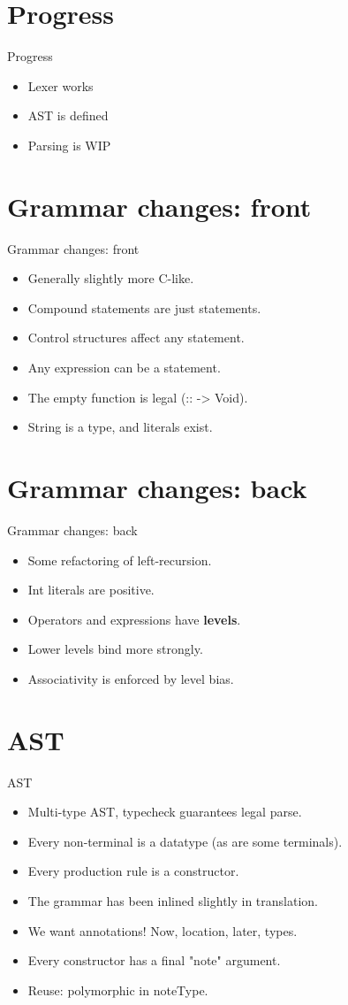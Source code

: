 \documentclass
  [ department=icis
  , notes={show notes}
  , slidesperpage=1
  , nohandout
  , official=true
  ] {beamerruhuisstijl}
\newcommand{\frameAndSection}[1]{\section{#1}\begin{frame}{#1}}
\begin{document}
\frameAndSection{Progress}
\onslide<+->
\begin{itemize}
    \onslide<+->\item Lexer works
    \onslide<+->\item AST is defined
    \onslide<+->\item Parsing is WIP
\end{itemize}
\end{frame}

\frameAndSection{Grammar changes: front}
\onslide<+->
\begin{itemize}
    \onslide<+->\item Generally slightly more C-like.
    \onslide<+->\item Compound statements are just statements.
    \onslide<+->\item Control structures affect any statement.
    \onslide<+->\item Any expression can be a statement.
    \onslide<+->\item The empty function is legal (:: -> Void).
    \onslide<+->\item String is a type, and literals exist.
\end{itemize}
\end{frame}

\frameAndSection{Grammar changes: back}
\onslide<+->
\begin{itemize}
    \onslide<+->\item Some refactoring of left-recursion.
    \onslide<+->\item Int literals are positive.
    \onslide<+->\item Operators and expressions have \textbf{levels}.
    \onslide<+->\item Lower levels bind more strongly. 
    \onslide<+->\item Associativity is enforced by level bias. 
\end{itemize}
\end{frame}

\frameAndSection{AST}
\onslide<+->
\begin{itemize}
    \onslide<+->\item Multi-type AST, typecheck guarantees legal parse.
    \onslide<+->\item Every non-terminal is a datatype (as are some terminals).
    \onslide<+->\item Every production rule is a constructor.
    \onslide<+->\item The grammar has been inlined slightly in translation.
    \onslide<+->\item We want annotations! Now, location, later, types.
    \onslide<+->\item Every constructor has a final "note" argument.
    \onslide<+->\item Reuse: polymorphic in noteType.
\end{itemize}
\end{frame}
\end{document}
